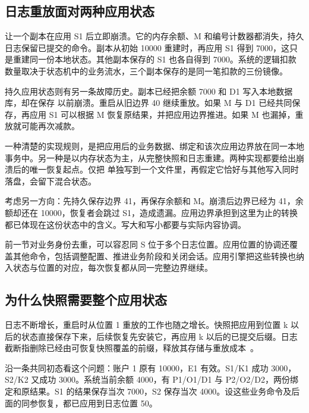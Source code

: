 \subsection*{日志重放面对两种应用状态}

让一个副本在应用 S1 后立即崩溃。它的内存余额、M 和编号计数器都消失，持久日志保留已提交的命令。副本从初始 10000 重建时，再应用 S1 得到 7000，这只是重建同一份本地状态。其他副本保存的 S1 也各自得到 7000。系统的逻辑扣款数量取决于状态机中的业务流水，三个副本保存的是同一笔扣款的三份镜像。

持久应用状态则有另一条故障历史。副本已经把余额 7000 和 D1 写入本地数据库，却在保存  以前崩溃。重启从旧边界 40 继续重放。如果 M 与 D1 已经共同保存，再应用 S1 可以根据 M 恢复原结果，并把应用边界推进。如果 M 也漏掉，重放就可能再次减款。

一种清楚的实现规则，是把应用后的业务数据、绑定和该次应用边界放在同一本地事务中。另一种是以内存状态为主，从完整快照和日志重建。两种实现都要给出崩溃后的唯一恢复起点。仅把  单独写到一个文件里，再假定它恰好与其他写入同时落盘，会留下混合状态。


考虑另一方向：先持久保存边界 41，再保存余额和 M。崩溃后边界已经为 41，余额却还在 10000，恢复者会跳过 S1，造成遗漏。应用边界承担到这里为止的转换都已体现在这份状态中的含义。写大和写小都要与实际内容协调。


前一节对业务身份去重，可以容忍同 S 位于多个日志位置。应用位置的协调还覆盖其他命令，包括调整配置、推进业务阶段和关闭会话。应用引擎把这些转换也纳入状态与位置的对应，每次恢复都从同一完整边界继续。

\subsection*{为什么快照需要整个应用状态}

日志不断增长，重启时从位置 1 重放的工作也随之增长。快照把应用到位置 k 以后的状态直接保存下来，后续恢复先安装它，再应用 k 以后的已提交后缀。日志截断指删除已经由可恢复快照覆盖的前缀，释放其存储与重放成本~\cite{raft}。

沿一条共同初态看这个问题：账户 1 原有 10000，E1 有效。S1/K1 成功 3000，S2/K2 又成功 3000。系统当前余额 4000，有 P1/O1/D1 与 P2/O2/D2，两份绑定和原结果。S1 的结果保存当次 7000，S2 保存当次 4000。设这些业务命令及后面的同参恢复，都已应用到日志位置 50。


